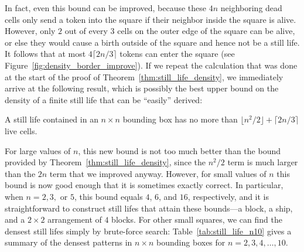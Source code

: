 In fact, even this bound can be improved, because these $4n$ neighboring dead cells only send a token into the square if their neighbor inside the square is alive. However, only $2$ out of every $3$ cells on the outer edge of the square can be alive, or else they would cause a birth outside of the square and hence not be a still life. It follows that at most $4\lceil 2n/3 \rceil$ tokens can enter the square (see Figure~\ref{fig:density_border_improve}). If we repeat the calculation that was done at the start of the proof of Theorem~\ref{thm:still_life_density}, we immediately arrive at the following result, which is possibly the best upper bound on the density of a finite still life that can be ``easily'' derived:

\begin{theorem}\label{thm:still_life_density_better}
	A still life contained in an $n \times n$ bounding box has no more than $\lfloor n^2/2 \rfloor + \lceil 2n/3 \rceil$ live cells.
\end{theorem}

For large values of $n$, this new bound is not too much better than the bound provided by Theorem~\ref{thm:still_life_density}, since the $n^2/2$ term is much larger than the $2n$ term that we improved anyway. However, for small values of $n$ this bound is now good enough that it is sometimes exactly correct. In particular, when $n = 2, 3,$ or $5$, this bound equals $4$, $6$, and $16$, respectively, and it is straightforward to construct still lifes that attain these bounds---a block, a ship, and a $2 \times 2$ arrangement of $4$ blocks. For other small squares, we can find the densest still lifes simply by brute-force search: Table~\ref{tab:still_life_n10} gives a summary of the densest patterns in $n \times n$ bounding boxes for $n = 2, 3, 4, \ldots, 10$.

